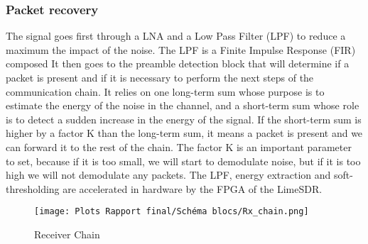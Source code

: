\documentclass{article}
\begin{document}
\subsubsection{Packet recovery}
The signal goes first through a LNA and a Low Pass Filter (LPF) to reduce a maximum the impact of the noise. The LPF is a Finite Impulse Response (FIR) composed It then goes to the preamble detection block that will determine if a packet is present and if it is necessary to perform the next steps of the communication chain. It relies on one long-term sum whose purpose is to estimate the energy of the noise in the channel, and a short-term sum whose role is to detect a sudden increase in the energy of the signal. If the short-term sum is higher by a factor K than the long-term sum, it means a packet is present and we can forward it to the rest of the chain. The factor K is an important parameter to set, because if it is too small, we will start to demodulate noise, but if it is too high we will not demodulate any packets. The LPF, energy extraction and soft-thresholding are accelerated in hardware by the FPGA of the LimeSDR. \\

\begin{figure}[H]  %
    \centering
    \texttt{[image: Plots Rapport final/Schéma blocs/Rx\_chain.png]}
    \caption{Receiver Chain}
    \label{fig:enter-label}
\end{figure}

\end{document}

